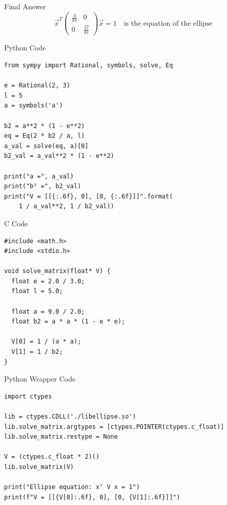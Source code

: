 \documentclass{beamer}
\begin{document}
\begin{frame}{Final Answer}
\[
\boxed{
\vec{x}^T
\begin{pmatrix}
\frac{4}{81} & 0 \\
0 & \frac{17}{81}
\end{pmatrix}
\vec{x} = 1
}
\quad \text{is the equation of the ellipse}
\]
\end{frame}

\begin{frame}[fragile]{Python Code}
\lstset{language=Python}
\begin{lstlisting}
from sympy import Rational, symbols, solve, Eq

e = Rational(2, 3)
l = 5
a = symbols('a')

b2 = a**2 * (1 - e**2)
eq = Eq(2 * b2 / a, l)
a_val = solve(eq, a)[0]
b2_val = a_val**2 * (1 - e**2)

print("a =", a_val)
print("b² =", b2_val)
print("V = [[{:.6f}, 0], [0, {:.6f}]]".format(
    1 / a_val**2, 1 / b2_val))
\end{lstlisting}
\end{frame}



\begin{frame}[fragile]{C Code}
\lstset{language=C}
\begin{lstlisting}
#include <math.h>
#include <stdio.h>

void solve_matrix(float* V) {
  float e = 2.0 / 3.0;
  float l = 5.0;

  float a = 9.0 / 2.0;
  float b2 = a * a * (1 - e * e);

  V[0] = 1 / (a * a);
  V[1] = 1 / b2;
}
\end{lstlisting}
\end{frame}




\begin{frame}[fragile]{Python Wrapper Code}
\lstset{language=Python}
\begin{lstlisting}
import ctypes

lib = ctypes.CDLL('./libellipse.so')
lib.solve_matrix.argtypes = [ctypes.POINTER(ctypes.c_float)]
lib.solve_matrix.restype = None

V = (ctypes.c_float * 2)()
lib.solve_matrix(V)

print("Ellipse equation: xᵀ V x = 1")
print(f"V = [[{V[0]:.6f}, 0], [0, {V[1]:.6f}]]")
\end{lstlisting}
\end{frame}
\end{document}
